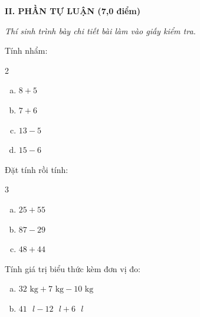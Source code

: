\vspace{4mm}
\textbf{\large II. PHẦN TỰ LUẬN (7,0 điểm)}

{\itshape Thí sinh trình bày chi tiết bài làm vào giấy kiểm tra.}

\begin{bt}[1,0 điểm]
Tính nhẩm:
\begin{multicols}{2}
\begin{enumerate}[a)]
  \item $8 + 5$
  \item $7 + 6$
  \item $13 - 5$
  \item $15 - 6$
\end{enumerate}
\end{multicols}
\end{bt}

\begin{bt}[1,5 điểm]
Đặt tính rồi tính:
\begin{multicols}{3}
\begin{enumerate}[a)]
  \item $25 + 55$
  \item $87 - 29$
  \item $48 + 44$
\end{enumerate}
\end{multicols}
\end{bt}

\begin{bt}[1,0 điểm]
Tính giá trị biểu thức kèm đơn vị đo:
\begin{enumerate}[a)]
  \item $32\text{ kg} + 7\text{ kg} - 10\text{ kg}$
  \item $41\text{ }l - 12\text{ }l + 6\text{ }l$
\end{enumerate}
\end{bt}

